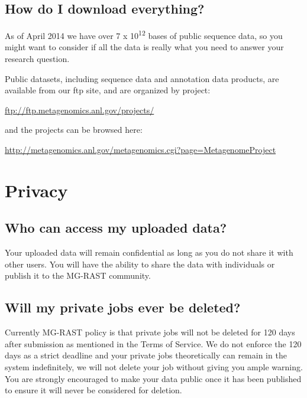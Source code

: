 \documentclass[12pt,fullpage]{report}
\begin{document}
\subsection{How do I download everything?}
As of April 2014 we have over 7 x 10\textsuperscript{12}  bases of public sequence data, so you might want to consider if all the data is really what you need to answer your research question.

Public datasets, including sequence data and annotation data products, are available from our ftp site, and are organized by project:\\
\begin{small}
\url{ftp://ftp.metagenomics.anl.gov/projects/}
\end{small}

\noindent
and the projects can be browsed here:\\
\begin{small}
\noindent
\url{http://metagenomics.anl.gov/metagenomics.cgi?page=MetagenomeProject}
\end{small}
\section{Privacy}
\subsection{Who can access my uploaded data?}
Your uploaded data will remain confidential as long as you do not share it with other users. You will have the ability to share the data with individuals or publish it to the MG-RAST community.
\subsection{Will my private jobs ever be deleted?}
Currently MG-RAST policy is that private jobs will not be deleted for 120 days after submission as mentioned in the Terms of Service.
We do not enforce the 120 days as a strict deadline and your private jobs theoretically can remain in the system indefinitely, we will not delete your job without giving you ample warning.
You are strongly encouraged to make your data public once it has been published to ensure it will never be considered for deletion.
\end{document}
